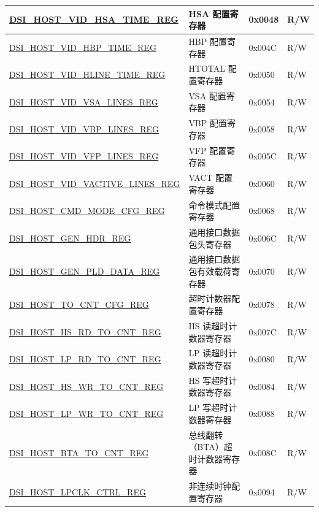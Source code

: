 \begin{longtable}{ | p{6.8cm} | p{6.8cm} | p{1.2cm} | p{1cm} | }
\hyperref[regdesc:DSIHOSTVIDHSATIMEREG]{DSI\_HOST\_VID\_HSA\_TIME\_REG} & HSA 配置寄存器 & 0x0048 & R/W \\ \hline
\hyperref[regdesc:DSIHOSTVIDHBPTIMEREG]{DSI\_HOST\_VID\_HBP\_TIME\_REG} & HBP 配置寄存器 & 0x004C & R/W \\ \hline
\hyperref[regdesc:DSIHOSTVIDHLINETIMEREG]{DSI\_HOST\_VID\_HLINE\_TIME\_REG} & HTOTAL 配置寄存器 & 0x0050 & R/W \\ \hline
\hyperref[regdesc:DSIHOSTVIDVSALINESREG]{DSI\_HOST\_VID\_VSA\_LINES\_REG} & VSA 配置寄存器 & 0x0054 & R/W \\ \hline
\hyperref[regdesc:DSIHOSTVIDVBPLINESREG]{DSI\_HOST\_VID\_VBP\_LINES\_REG} & VBP 配置寄存器 & 0x0058 & R/W \\ \hline
\hyperref[regdesc:DSIHOSTVIDVFPLINESREG]{DSI\_HOST\_VID\_VFP\_LINES\_REG} & VFP 配置寄存器 & 0x005C & R/W \\ \hline
\hyperref[regdesc:DSIHOSTVIDVACTIVELINESREG]{DSI\_HOST\_VID\_VACTIVE\_LINES\_REG} & VACT 配置寄存器 & 0x0060 & R/W \\ \hline
\hyperref[regdesc:DSIHOSTCMDMODECFGREG]{DSI\_HOST\_CMD\_MODE\_CFG\_REG} & 命令模式配置寄存器 & 0x0068 & R/W \\ \hline
\hyperref[regdesc:DSIHOSTGENHDRREG]{DSI\_HOST\_GEN\_HDR\_REG} & 通用接口数据包头寄存器 & 0x006C & R/W \\ \hline
\hyperref[regdesc:DSIHOSTGENPLDDATAREG]{DSI\_HOST\_GEN\_PLD\_DATA\_REG} & 通用接口数据包有效载荷寄存器 & 0x0070 & R/W \\ \hline
\hyperref[regdesc:DSIHOSTTOCNTCFGREG]{DSI\_HOST\_TO\_CNT\_CFG\_REG} & 超时计数器配置寄存器 & 0x0078 & R/W \\ \hline
\hyperref[regdesc:DSIHOSTHSRDTOCNTREG]{DSI\_HOST\_HS\_RD\_TO\_CNT\_REG} & HS 读超时计数器寄存器 & 0x007C & R/W \\ \hline
\hyperref[regdesc:DSIHOSTLPRDTOCNTREG]{DSI\_HOST\_LP\_RD\_TO\_CNT\_REG} & LP 读超时计数器寄存器 & 0x0080 & R/W \\ \hline
\hyperref[regdesc:DSIHOSTHSWRTOCNTREG]{DSI\_HOST\_HS\_WR\_TO\_CNT\_REG} & HS 写超时计数器寄存器 & 0x0084 & R/W \\ \hline
\hyperref[regdesc:DSIHOSTLPWRTOCNTREG]{DSI\_HOST\_LP\_WR\_TO\_CNT\_REG} & LP 写超时计数器寄存器 & 0x0088 & R/W \\ \hline
\hyperref[regdesc:DSIHOSTBTATOCNTREG]{DSI\_HOST\_BTA\_TO\_CNT\_REG} & 总线翻转（BTA）超时计数器寄存器 & 0x008C & R/W \\ \hline
\hyperref[regdesc:DSIHOSTLPCLKCTRLREG]{DSI\_HOST\_LPCLK\_CTRL\_REG} & 非连续时钟配置寄存器 & 0x0094 & R/W \\ \hline

\end{longtable}
